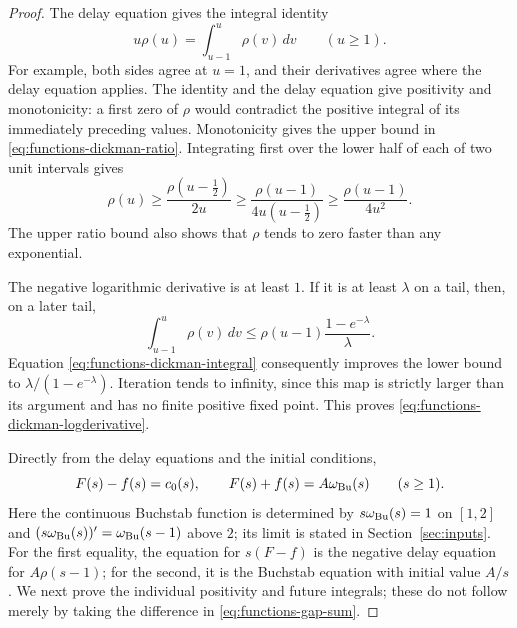 \begin{proof}
The delay equation gives the integral identity
\begin{equation}\label{eq:functions-dickman-integral}
 u\rho(u)=\int_{u-1}^{u}\rho(v)\,dv\qquad(u\ge1).
\end{equation}
For example, both sides agree at \(u=1\), and their derivatives agree
where the delay equation applies.  The identity and the delay equation
give positivity and monotonicity: a first zero of \(\rho\) would contradict
the positive integral of its immediately preceding values.
Monotonicity gives the upper bound in
\eqref{eq:functions-dickman-ratio}.  Integrating first over the lower
half of each of two unit intervals gives
\[
 \rho(u)\ge\frac{\rho(u-\tfrac12)}{2u}
 \ge\frac{\rho(u-1)}{4u(u-\tfrac12)}
 \ge\frac{\rho(u-1)}{4u^2}.
\]
The upper ratio bound also shows that \(\rho\) tends to zero faster
than any exponential.

The negative logarithmic derivative is at least \(1\).  If it is at
least \(\lambda\) on a tail, then, on a later tail,
\[
 \int_{u-1}^{u}\rho(v)\,dv
 \le \rho(u-1)\frac{1-e^{-\lambda}}{\lambda}.
\]
Equation \eqref{eq:functions-dickman-integral} consequently improves
the lower bound to \(\lambda/(1-e^{-\lambda})\).
Iteration tends to infinity, since this map is strictly larger than its
argument and has no finite positive fixed point.  This proves
\eqref{eq:functions-dickman-logderivative}.

Directly from the delay equations and the initial conditions,
\begin{equation}\label{eq:functions-gap-sum}
 F(s)-f(s)=c_0(s),\qquad
 F(s)+f(s)=A\omega_{\rm Bu}(s)\qquad(s\ge1).
\end{equation}
Here the continuous Buchstab function is determined by
\(s\omega_{\rm Bu}(s)=1\) on \([1,2]\) and
\((s\omega_{\rm Bu}(s))'=\omega_{\rm Bu}(s-1)\) above \(2\);
its limit is stated in Section~\ref{sec:inputs}.
For the first equality, the equation for
\(s(F-f)\) is the negative delay equation for \(A\rho(s-1)\);
for the second, it is the Buchstab equation with initial value \(A/s\).
We next prove the individual positivity and future integrals; these do
not follow merely by taking the difference in
\eqref{eq:functions-gap-sum}.


\end{proof}
